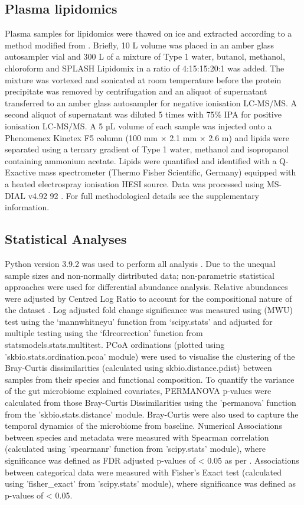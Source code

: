 \documentclass{article}
\begin{document}
\subsection*{Plasma lipidomics}
Plasma samples for lipidomics were thawed on ice and extracted according to a method modified from \citet*{liu2016plasma}.
Briefly, 10 \textmu{}L volume was placed in an amber glass autosampler vial and 300 \textmu{}L of a mixture of Type 1 water, butanol, methanol, chloroform and SPLASH Lipidomix in a ratio of 4:15:15:20:1 was added.
The mixture was vortexed and sonicated at room temperature before the protein precipitate was removed by centrifugation and an aliquot of supernatant transferred to an amber glass autosampler for negative ionisation LC-MS/MS.
A second aliquot of supernatant was diluted 5 times with 75\% IPA for positive ionisation LC-MS/MS.
A 5 µL volume of each sample was injected onto a Phenomenex Kinetex F5 column (100 mm × 2.1 mm × 2.6 \textmu{}m) and lipids were separated using a ternary gradient of Type 1 water, methanol and isopropanol containing ammonium acetate.
Lipids were quantified and identified with a Q-Exactive mass spectrometer (Thermo Fisher Scientific, Germany) equipped with a heated electrospray ionisation HESI source.
Data was processed using MS-DIAL v4.92 92 \cite{tsugawa2015ms}.
For full methodological details see the supplementary information.

\subsection*{Statistical Analyses}
Python version 3.9.2 was used to perform all analysis \cite{van1995python}.
Due to the unequal sample sizes and non-normally distributed data; non-parametric statistical approaches were used for differential abundance analysis.
Relative abundances were adjusted by Centred Log Ratio to account for the compositional nature of the dataset \cite{gloor2016s}.
Log adjusted fold change significance was measured using (\gls{MWU}) test using the ‘mannwhitneyu’ function from ‘scipy.stats’ and adjusted for multiple testing using the ‘fdrcorrection’ function from statsmodels.stats.multitest.
\gls{PCoA} ordinations (plotted using 'skbio.stats.ordination.pcoa' module) were used to visualise the clustering of the Bray-Curtis dissimilarities (calculated using skbio.distance.pdist) between samples from their species and functional composition.
To quantify the variance of the gut microbiome explained covariates, \gls{PERMANOVA} p-values were calculated from those Bray-Curtis Dissimilarities using the ’permanova’ function from the 'skbio.stats.distance' module.
Bray-Curtis were also used to capture the temporal dynamics of the microbiome from baseline.
Numerical Associations between species and metadata were measured with Spearman correlation (calculated using 'spearmanr' function from 'scipy.stats' module), where significance was defined as \gls{FDR} adjusted p-values of \textless{} 0.05 as per \citet*{2020SciPyNMeth}.
Associations between categorical data were measured with Fisher's Exact test (calculated using 'fisher\_exact' from 'scipy.stats' module), where significance was defined as p-values of \textless{} 0.05.
\end{document}
